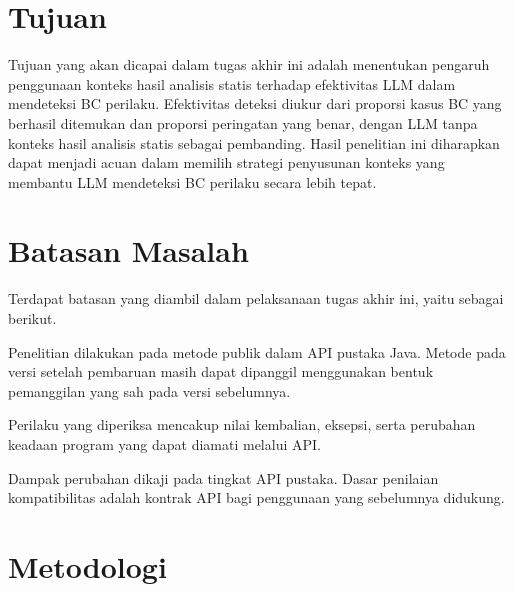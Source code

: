 \section{Tujuan}
\label{sec:tujuan}

\begingroup
{}
Tujuan yang akan dicapai dalam tugas akhir ini adalah menentukan pengaruh penggunaan konteks hasil analisis statis terhadap efektivitas LLM dalam mendeteksi BC perilaku. Efektivitas deteksi diukur dari proporsi kasus BC yang berhasil ditemukan dan proporsi peringatan yang benar, dengan LLM tanpa konteks hasil analisis statis sebagai pembanding. Hasil penelitian ini diharapkan dapat menjadi acuan dalam memilih strategi penyusunan konteks yang membantu LLM mendeteksi BC perilaku secara lebih tepat.

\par
\endgroup

\section{Batasan Masalah}
\label{sec:batasan-masalah}

Terdapat batasan yang diambil dalam pelaksanaan tugas akhir ini, yaitu sebagai berikut.

\begin{enumerate}
    \begin{samepage}
    \item Penelitian dilakukan pada metode publik dalam API pustaka Java. Metode pada versi setelah pembaruan masih dapat dipanggil menggunakan bentuk pemanggilan yang sah pada versi sebelumnya.
    \par
    \end{samepage}
    \begin{samepage}
    \item Perilaku yang diperiksa mencakup nilai kembalian, eksepsi, serta perubahan keadaan program yang dapat diamati melalui API\@.
    \par
    \end{samepage}
    \begin{samepage}
    \item Dampak perubahan dikaji pada tingkat API pustaka. Dasar penilaian kompatibilitas adalah kontrak API bagi penggunaan yang sebelumnya didukung.
    \par
    \end{samepage}
\end{enumerate}

\section{Metodologi}
\label{sec:metodologi}

